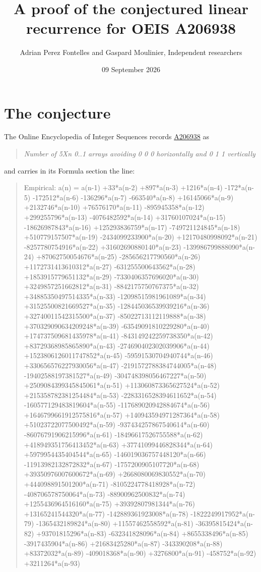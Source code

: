\documentclass[11pt]{article}
\title{A proof of the conjectured linear recurrence for OEIS A206938}
\author{Adrian Perez Fontelles and Gaspard Moulinier, Independent researchers}
\date{09 September 2026}
\theoremstyle{definition}
\begin{document}
\maketitle
\section{The conjecture}

The Online Encyclopedia of Integer Sequences records \href{https://oeis.org/A206938}{A206938} as

\begin{quote}\itshape Number of 5Xn 0..1 arrays avoiding 0 0 0 horizontally and 0 1 1 vertically\end{quote}

and carries in its Formula section the line:

\begin{quote}\ttfamily Empirical: a(n) = a(n-1) +33*a(n-2) +897*a(n-3) +1216*a(n-4) -172*a(n-5) -172512*a(n-6) -136296*a(n-7) -663540*a(n-8) +16145066*a(n-9) +2132746*a(n-10) +76576170*a(n-11) -895945358*a(n-12) +299255796*a(n-13) -4076482592*a(n-14) +31760107024*a(n-15) -18626987843*a(n-16) +125293836759*a(n-17) -749721124845*a(n-18) +510779157507*a(n-19) -2434099233900*a(n-20) +12170480998092*a(n-21) -8257780754916*a(n-22) +31602690880140*a(n-23) -139986799888090*a(n-24) +87062750054676*a(n-25) -285656217790560*a(n-26) +1172731413610312*a(n-27) -631255500643562*a(n-28) +1853915779651132*a(n-29) -7330406357696020*a(n-30) +3249857251662812*a(n-31) -8842175750767375*a(n-32) +34885350497514335*a(n-33) -12098515981961089*a(n-34) +31525500821669527*a(n-35) -128445036539939216*a(n-36) +32740011542315500*a(n-37) -85022713112119888*a(n-38) +370329090634209248*a(n-39) -63549091810229280*a(n-40) +174737509681435978*a(n-41) -843149242259738350*a(n-42) +83729368985865890*a(n-43) -274690402302039906*a(n-44) +1523806126011747852*a(n-45) -59591530704940744*a(n-46) +330656576227930056*a(n-47) -2191572788384744005*a(n-48) -19402588197381527*a(n-49) -304748398056467227*a(n-50) +2509084399345845061*a(n-51) +113060873365627524*a(n-52) +215358782381254484*a(n-53) -2283316528394611652*a(n-54) -160577129483819604*a(n-55) -117689020942884674*a(n-56) +1646799661912575816*a(n-57) +140943594971287364*a(n-58) +51023722077500492*a(n-59) -937434257867540614*a(n-60) -86076791906215996*a(n-61) -18496617526755588*a(n-62) +418949351756413452*a(n-63) +37741099446828344*a(n-64) +5979954435404544*a(n-65) -146019036757448120*a(n-66) -11913982132872832*a(n-67) -1757200905107720*a(n-68) +39350976007600672*a(n-69) +2668080069830552*a(n-70) +444098891501200*a(n-71) -8105224778418928*a(n-72) -408706578750064*a(n-73) -88900962500832*a(n-74) +1255436964516160*a(n-75) +39392807981344*a(n-76) +13165241544320*a(n-77) -142889361923008*a(n-78) -1822249917952*a(n-79) -1365432189824*a(n-80) +11557462558592*a(n-81) -36395815424*a(n-82) +93701815296*a(n-83) -632341828096*a(n-84) +8655338496*a(n-85) -3917435904*a(n-86) +21683425280*a(n-87) -343390208*a(n-88) +83372032*a(n-89) -409018368*a(n-90) +3276800*a(n-91) -458752*a(n-92) +3211264*a(n-93)\end{quote}
\end{document}
